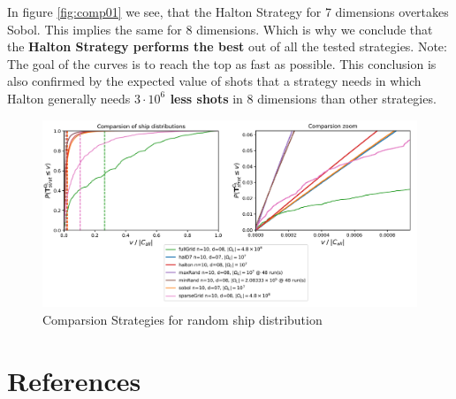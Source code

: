 \documentclass[final,hyperref={pdfpagelabels=false},table]{beamer}
\begin{document}
\begin{frame}
\begin{columns}[T]
\begin{column}{\colCWidth}
In figure \ref{fig:comp01} we see, that the Halton Strategy for 7 dimensions overtakes Sobol. This implies the same for 8 dimensions. Which is why we conclude that the \textbf{Halton Strategy performs the best} out of all the tested strategies. Note: The goal of the curves is to reach the top as fast as possible.
This conclusion is also confirmed by the expected value of shots that a strategy needs in which Halton generally needs \textbf{$3\cdot10^6$ less shots} in 8 dimensions than other strategies.
\begin{figure}[h]
	\centering
	\includegraphics[width=\textwidth]{../gfx/Compare03.png}
	\caption{Comparsion Strategies for random ship distribution}
	\label{fig:comp02}
\end{figure}



\section{References}
\normalem %




\end{column}
\end{columns}

\end{frame}
\end{document}
